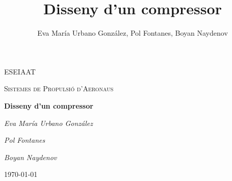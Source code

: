 \documentclass[12pt,a4paper]{article}
\author{Eva María Urbano González, Pol Fontanes, Boyan Naydenov}
\title{Disseny d'un compressor}
\begin{document}
\begin{titlepage}
	\centering
	\vspace{4.5cm}
	{\scshape ESEIAAT \par}
	{\scshape\Large Sistemes de Propulsió d'Aeronaus \par}
	\vspace{1.5cm}
	{\huge\bfseries Disseny d'un compressor \par}
	\vspace{15cm}
	{\Large\itshape Eva María Urbano González\par}
	{\Large\itshape Pol Fontanes\par}
	{\Large\itshape Boyan Naydenov\par}
	\vfill
	\vspace{1cm}
	\today
\end{titlepage}
\tableofcontents
\lstlistoflistings
\listoffigures
\pagebreak





\newpage


\newpage


\newpage
\appendix

\end{document}
